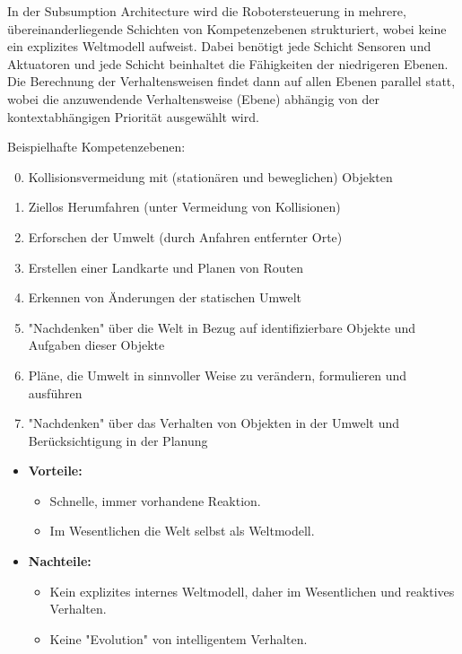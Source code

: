 			In der Subsumption Architecture wird die Robotersteuerung in mehrere, übereinanderliegende Schichten von Kompetenzebenen strukturiert, wobei keine ein explizites Weltmodell aufweist. Dabei benötigt jede Schicht Sensoren und Aktuatoren und jede Schicht beinhaltet die Fähigkeiten der niedrigeren Ebenen. Die Berechnung der Verhaltensweisen findet dann auf allen Ebenen parallel statt, wobei die anzuwendende Verhaltensweise (\bzw Ebene) abhängig von der kontextabhängigen Priorität ausgewählt wird.
			
			Beispielhafte Kompetenzebenen:
			\begin{enumerate}
				\setcounter{enumi}{-1}
				\item Kollisionsvermeidung mit (stationären und beweglichen) Objekten
				\item Ziellos Herumfahren (unter Vermeidung von Kollisionen)
				\item Erforschen der Umwelt (durch Anfahren entfernter Orte)
				\item Erstellen einer Landkarte und Planen von Routen
				\item Erkennen von Änderungen der statischen Umwelt
				\item "Nachdenken" über die Welt in Bezug auf identifizierbare Objekte und Aufgaben \bzgl dieser Objekte
				\item Pläne, die Umwelt in sinnvoller Weise zu verändern, formulieren und ausführen
				\item "Nachdenken" über das Verhalten von Objekten in der Umwelt und Berücksichtigung in der Planung
			\end{enumerate}
		
			\begin{itemize}
				\item \textbf{Vorteile:}
					\begin{itemize}
						\item Schnelle, immer vorhandene Reaktion.
						\item Im Wesentlichen die Welt selbst als Weltmodell.
					\end{itemize}
				\item \textbf{Nachteile:}
					\begin{itemize}
						\item Kein explizites internes Weltmodell, daher im Wesentlichen und reaktives Verhalten.
						\item Keine "Evolution" von intelligentem Verhalten.
					\end{itemize}
			\end{itemize}

